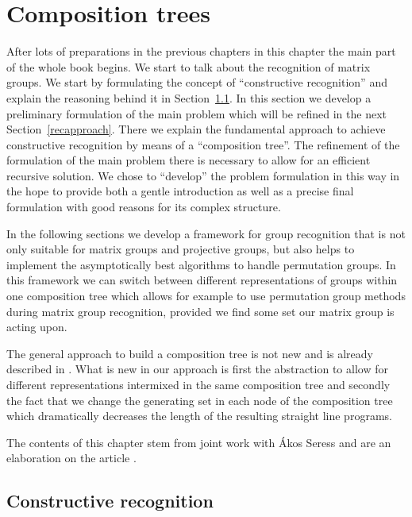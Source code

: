 
\chapter{Composition trees}
\label{chap:comptree}

After lots of preparations in the previous chapters
in this chapter the main part of the whole book begins. We start to talk
about the recognition of matrix groups. We start by formulating
the concept of ``constructive recognition'' and explain the reasoning
behind it in Section~\ref{constrrecog}. In this section we develop
a preliminary formulation of the main problem which will be refined
in the next Section~\ref{recapproach}. There we explain the fundamental
approach to achieve
constructive recognition by means of a ``composition tree''.
The refinement of the formulation of the main
problem there is necessary to allow for an efficient recursive solution.
We chose to ``develop'' the problem formulation in this way in the hope
to provide both a gentle introduction as well as a precise final
formulation with good reasons for its complex structure.

In the following sections we develop a
framework for group recognition that is not only suitable for matrix
groups and projective groups, but also helps to implement
the asymptotically best algorithms to handle permutation groups. In
this framework we can switch between different representations of
groups within one composition tree which allows for example to use 
permutation group methods during matrix group recognition, provided
we find some set our matrix group is acting upon.

The general approach to build a composition tree is not new and is
already described in \cite{MatGrpProj}. What is new in our approach
is first the abstraction to allow for different representations
intermixed in the same composition tree and secondly the fact that
we change the generating set in each node of the composition tree
which dramatically decreases the length of the resulting straight
line programs. 

The contents of this chapter stem from joint work with \'Akos Seress
and are an elaboration on the article \cite{AkosMaxISSAC}.

\section{Constructive recognition}
\label{constrrecog}

